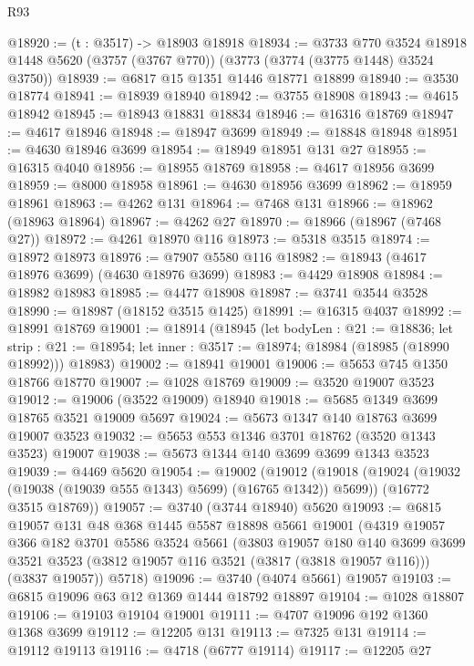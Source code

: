 \begin{lexlean}{R93}
\begin{coremodule}
@18920 := (t : @3517) -> @18903 @18918
@18934 := @3733
    @770
    @3524
    @18918
    @1448
    @5620
    (@3757 (@3767 @770))
    (@3773 (@3774 (@3775 @1448) @3524 @3750))
@18939 := @6817 @15 @1351 @1446 @18771 @18899
@18940 := @3530 @18774
@18941 := @18939 @18940
@18942 := @3755 @18908
@18943 := @4615 @18942
@18945 := @18943 @18831 @18834
@18946 := @16316 @18769
@18947 := @4617 @18946
@18948 := @18947 @3699
@18949 := @18848 @18948
@18951 := @4630 @18946 @3699
@18954 := @18949 @18951 @131 @27
@18955 := @16315 @4040
@18956 := @18955 @18769
@18958 := @4617 @18956 @3699
@18959 := @8000 @18958
@18961 := @4630 @18956 @3699
@18962 := @18959 @18961
@18963 := @4262 @131
@18964 := @7468 @131
@18966 := @18962 (@18963 @18964)
@18967 := @4262 @27
@18970 := @18966 (@18967 (@7468 @27))
@18972 := @4261 @18970 @116
@18973 := @5318 @3515
@18974 := @18972 @18973
@18976 := @7907 @5580 @116
@18982 := @18943 (@4617 @18976 @3699) (@4630 @18976 @3699)
@18983 := @4429 @18908
@18984 := @18982 @18983
@18985 := @4477 @18908
@18987 := @3741 @3544 @3528
@18990 := @18987 (@18152 @3515 @1425)
@18991 := @16315 @4037
@18992 := @18991 @18769
@19001 := @18914
    (@18945
      (let bodyLen : @21 := @18836;
      let strip : @21 := @18954; let inner : @3517 := @18974; @18984 (@18985 (@18990 @18992)))
      @18983)
@19002 := @18941 @19001
@19006 := @5653 @745 @1350 @18766 @18770
@19007 := @1028 @18769
@19009 := @3520 @19007 @3523
@19012 := @19006 (@3522 @19009) @18940
@19018 := @5685 @1349 @3699 @18765 @3521 @19009 @5697
@19024 := @5673 @1347 @140 @18763 @3699 @19007 @3523
@19032 := @5653 @553 @1346 @3701 @18762 (@3520 @1343 @3523) @19007
@19038 := @5673 @1344 @140 @3699 @3699 @1343 @3523
@19039 := @4469 @5620
@19054 := @19002
    (@19012
      (@19018 (@19024 (@19032 (@19038 (@19039 @555 @1343) @5699) (@16765 @1342)) @5699))
      (@16772 @3515 @18769))
@19057 := @3740 (@3744 @18940) @5620
@19093 := @6815
    @19057
    @131
    @48
    @368
    @1445
    @5587
    @18898
    @5661
    @19001
    (@4319
      @19057
      @366
      @182
      @3701
      @5586
      @3524
      @5661
      (@3803
        @19057
        @180
        @140
        @3699
        @3699
        @3521
        @3523
        (@3812 @19057 @116 @3521 (@3817 (@3818 @19057 @116)))
        (@3837 @19057))
      @5718)
@19096 := @3740 (@4074 @5661) @19057
@19103 := @6815 @19096 @63 @12 @1369 @1444 @18792 @18897
@19104 := @1028 @18807
@19106 := @19103 @19104 @19001
@19111 := @4707 @19096 @192 @1360 @1368 @3699
@19112 := @12205 @131
@19113 := @7325 @131
@19114 := @19112 @19113
@19116 := @4718 (@6777 @19114)
@19117 := @12205 @27

\end{coremodule}
\end{lexlean}

